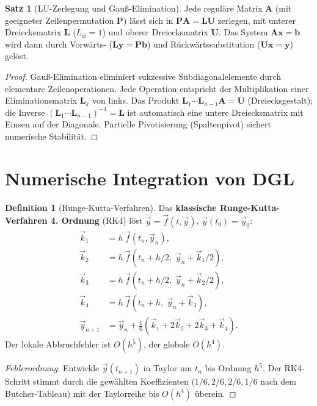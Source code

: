 ﻿\documentclass[a4paper,12pt]{report}
\theoremstyle{definition}
\newtheorem{definition}{Definition}
\newtheorem{satz}{Satz}
\begin{document}
\begin{satz}[LU-Zerlegung und Gauß-Elimination]
Jede reguläre Matrix $\mathbf{A}$ (mit geeigneter Zeilenpermutation $\mathbf{P}$)
lässt sich in $\mathbf{PA} = \mathbf{LU}$ zerlegen,
mit unterer Dreiecksmatrix $\mathbf{L}$ ($L_{ii} = 1$) und oberer
Dreiecksmatrix $\mathbf{U}$. Das System $\mathbf{Ax} = \mathbf{b}$ wird dann
durch Vorwärts- ($\mathbf{Ly} = \mathbf{Pb}$) und Rückwärtssubstitution
($\mathbf{Ux} = \mathbf{y}$) gelöst.
\end{satz}
\begin{proof}
Gauß-Elimination eliminiert sukzessive Subdiagonalelemente durch
elementare Zeilenoperationen. Jede Operation entspricht der Multiplikation
einer Eliminationsmatrix $\mathbf{L}_k$ von links.
Das Produkt $\mathbf{L}_1\cdots\mathbf{L}_{n-1}\mathbf{A} = \mathbf{U}$
(Dreiecksgestalt); die Inverse $(\mathbf{L}_1\cdots\mathbf{L}_{n-1})^{-1} = \mathbf{L}$
ist automatisch eine untere Dreiecksmatrix mit Einsen auf der Diagonale.
Partielle Pivotisierung (Spaltenpivot) sichert numerische Stabilität.
\end{proof}

\section{Numerische Integration von DGL}

\begin{definition}[Runge-Kutta-Verfahren]
Das \textbf{klassische Runge-Kutta-Verfahren 4. Ordnung} (RK4) löst
$\dot{\vec{y}} = \vec{f}(t, \vec{y})$, $\vec{y}(t_0) = \vec{y}_0$:
\begin{align*}
  \vec{k}_1 &= h\,\vec{f}(t_n, \vec{y}_n), \\
  \vec{k}_2 &= h\,\vec{f}(t_n+h/2,\; \vec{y}_n+\vec{k}_1/2), \\
  \vec{k}_3 &= h\,\vec{f}(t_n+h/2,\; \vec{y}_n+\vec{k}_2/2), \\
  \vec{k}_4 &= h\,\vec{f}(t_n+h,\; \vec{y}_n+\vec{k}_3), \\
  \vec{y}_{n+1} &= \vec{y}_n + \frac{1}{6}(\vec{k}_1 + 2\vec{k}_2 + 2\vec{k}_3 + \vec{k}_4).
\end{align*}
Der lokale Abbruchfehler ist $O(h^5)$, der globale $O(h^4)$.
\end{definition}
\begin{proof}[Fehlerordnung]
Entwickle $\vec{y}(t_{n+1})$ in Taylor um $t_n$ bis Ordnung $h^5$.
Der RK4-Schritt stimmt durch die gewählten Koeffizienten ($1/6, 2/6, 2/6, 1/6$
nach dem Butcher-Tableau) mit der Taylorreihe bis $O(h^4)$ überein.
\end{proof}
\end{document}
